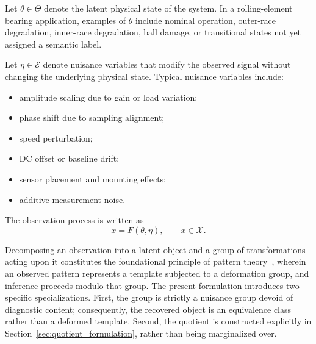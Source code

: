 \documentclass[a4paper]{cas-sc}
\newcommand{\X}{\ensuremath{\mathcal{X}}}
\newcommand{\ThetaSpace}{\ensuremath{\Theta}}
\newcommand{\EtaSpace}{\ensuremath{\mathcal{E}}}
\begin{document}
Let \(\theta \in \ThetaSpace\) denote the latent physical state of the
system. In a rolling-element bearing application, examples of \(\theta\)
include nominal operation, outer-race degradation, inner-race degradation,
ball damage, or transitional states not yet assigned a semantic label.

Let \(\eta \in \EtaSpace\) denote nuisance variables that modify the
observed signal without changing the underlying physical state. Typical
nuisance variables include:

\begin{itemize}[leftmargin=1.5em]
    \item amplitude scaling due to gain or load variation;
    \item phase shift due to sampling alignment;
    \item speed perturbation;
    \item DC offset or baseline drift;
    \item sensor placement and mounting effects;
    \item additive measurement noise.
\end{itemize}

The observation process is written as
\begin{equation}
    x = F(\theta,\eta), \qquad x \in \X .
    \label{eq:forward_model}
\end{equation}

Decomposing an observation into a latent object and a group of transformations acting upon it constitutes the foundational principle of pattern theory~\citep{grenander1994}, wherein an observed pattern represents a template subjected to a deformation group, and inference proceeds modulo that group. The present formulation introduces two specific specializations. First, the group is strictly a nuisance group devoid of diagnostic content; consequently, the recovered object is an equivalence class rather than a deformed template. Second, the quotient is constructed explicitly in Section~\ref{sec:quotient_formulation}, rather than being marginalized over.
\end{document}
